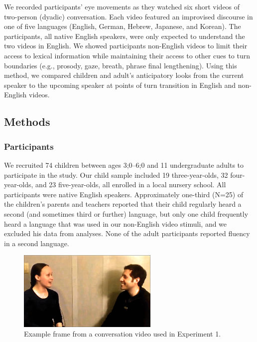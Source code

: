 \documentclass[authoryear, 12pt]{elsarticle}
\begin{document}
We recorded participants' eye movements as they watched six short videos of two-person (dyadic) conversation. Each video featured an improvised discourse in one of five languages (English, German, Hebrew, Japanese, and Korean). The participants, all native English speakers, were only expected to understand the two videos in English. We showed participants non-English videos to limit their access to lexical information while maintaining their access to other cues to turn boundaries (e.g., prosody, gaze, breath, phrase final lengthening). Using this method, we compared children and adult's anticipatory looks from the current speaker to the upcoming speaker at points of turn transition in English and non-English videos.

\subsection{Methods}
\label{sec:methods1}

\subsubsection{Participants}

We recruited 74 children between ages 3;0--6;0 and 11 undergraduate adults to participate in the study. Our child sample included 19 three-year-olds, 32 four-year-olds, and 23 five-year-olds, all enrolled in a local nursery school. All participants were native English speakers. Approximately one-third (N=25) of the children's parents and teachers reported that their child regularly heard a second (and sometimes third or further) language, but only one child frequently heard a language that was used in our non-English video stimuli, and we excluded his data from analyses. None of the adult participants reported fluency in a second language.

\begin{figure}[t]
\begin{center}
\includegraphics[width=0.6\textwidth]{figures/FIG-FL-stim.png}
\end{center}
\caption{Example frame from a conversation video used in Experiment 1.} 
\label{fig:speakers}
\end{figure}
\end{document}
